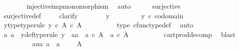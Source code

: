 \begin{isabellebody}
\ \ \ \ \ \ \isamarkupfalse%
\ injective{\isacharunderscore}{\kern0pt}imp{\isacharunderscore}{\kern0pt}monomorphism\ \isamarkupfalse%
\ auto\isanewline
\ \ \ \ \isamarkupfalse%
\ {\isachardoublequoteopen}surjective{\isacharparenleft}{\kern0pt}{\isasymphi}{\isacharparenright}{\kern0pt}{\isachardoublequoteclose}\isanewline
\ \ \ \ \ \ \isamarkupfalse%
\ surjective{\isacharunderscore}{\kern0pt}def\isanewline
\ \ \ \ \isamarkupfalse%
{\isacharparenleft}{\kern0pt}clarify{\isacharparenright}{\kern0pt}\isanewline
\ \ \ \ \ \ \isamarkupfalse%
\ y\ \isanewline
\ \ \ \ \ \ \isamarkupfalse%
\ {\isachardoublequoteopen}y\ {\isasymin}\isactrlsub c\ codomain\ {\isasymphi}{\isachardoublequoteclose}\ \isamarkupfalse%
\ \isamarkupfalse%
\ y{\isacharunderscore}{\kern0pt}type{\isacharbrackleft}{\kern0pt}type{\isacharunderscore}{\kern0pt}rule{\isacharbrackright}{\kern0pt}{\isacharcolon}{\kern0pt}\ {\isachardoublequoteopen}y\ {\isasymin}\isactrlsub c\ A\ {\isasymtimes}\isactrlsub c\ A{\isachardoublequoteclose}\isanewline
\ \ \ \ \ \ \ \ \isamarkupfalse%
\ {\isasymphi}{\isacharunderscore}{\kern0pt}type\ cfunc{\isacharunderscore}{\kern0pt}type{\isacharunderscore}{\kern0pt}def\ \isamarkupfalse%
\ auto\isanewline
\ \ \ \ \ \ \isamarkupfalse%
\ \isamarkupfalse%
\ a{}\ a{}\ \ y{\isacharunderscore}{\kern0pt}def{\isacharbrackleft}{\kern0pt}type{\isacharunderscore}{\kern0pt}rule{\isacharbrackright}{\kern0pt}{\isacharcolon}{\kern0pt}\ {\isachardoublequoteopen}y\ {\isacharequal}{\kern0pt}\ {\isasymlangle}a{}{\isacharcomma}{\kern0pt}a{}{\isasymrangle}\ {\isasymand}\ a{}\ {\isasymin}\isactrlsub c\ A\ {\isasymand}\ a{}\ {\isasymin}\isactrlsub c\ A{\isachardoublequoteclose}\isanewline
\ \ \ \ \ \ \ \ \isamarkupfalse%
\ cart{\isacharunderscore}{\kern0pt}prod{\isacharunderscore}{\kern0pt}decomp\ \isamarkupfalse%
\ blast\isanewline
\ \ \ \ \ \ \isamarkupfalse%
\ \isamarkupfalse%
\ aua{\isacharcolon}{\kern0pt}\ {\isachardoublequoteopen}{\isacharparenleft}{\kern0pt}a{}\ {\isasymamalg}\ a{}{\isacharparenright}{\kern0pt}{\isacharcolon}{\kern0pt}\ {\isasymone}\ {\isasymCoprod}\ {\isasymone}\ {\isasymrightarrow}\ A{\isachardoublequoteclose}\isanewline
\ \ \ \ \ \ \ \ \isamarkupfalse%

\end{isabellebody}
